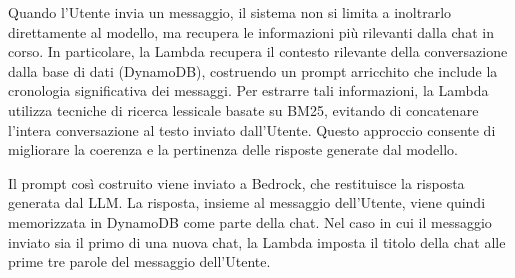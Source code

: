 \documentclass[a4paper,12pt]{article}
\begin{document}
Quando l’Utente invia un messaggio, il sistema non si limita a inoltrarlo direttamente al modello, ma recupera le informazioni più rilevanti dalla chat in corso. In particolare, la Lambda recupera il contesto rilevante della conversazione dalla base di dati (DynamoDB), costruendo un prompt arricchito che include la cronologia significativa dei messaggi. Per estrarre tali informazioni, la Lambda utilizza tecniche di ricerca lessicale basate su BM25, evitando di concatenare l'intera conversazione al testo inviato dall'Utente. Questo approccio consente di migliorare la coerenza e la pertinenza delle risposte generate dal modello.

Il prompt così costruito viene inviato a Bedrock, che restituisce la risposta generata dal LLM. La risposta, insieme al messaggio dell’Utente, viene quindi memorizzata in DynamoDB come parte della chat. Nel caso in cui il messaggio inviato sia il primo di una nuova chat, la Lambda imposta il titolo della chat alle prime tre parole del messaggio dell'Utente.
\end{document}
